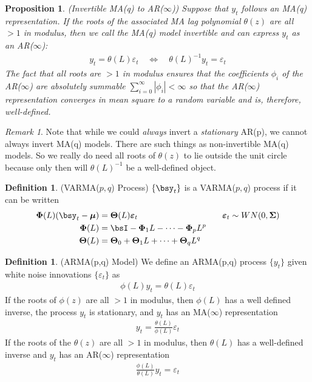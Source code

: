 \documentclass[12pt]{article}
\theoremstyle{plain}
\newtheorem{prop}[thm]{Proposition}
\theoremstyle{definition}
\newtheorem{defn}[thm]{Definition}
\theoremstyle{remark}
\newtheorem*{rmk}{Remark}
\newcommand{\bsTheta}{\boldsymbol{\Theta}}
\newcommand{\bsmu}{\boldsymbol{\mu}}
\newcommand{\bsSigma}{\boldsymbol{\Sigma}}
\newcommand{\bsvarepsilon}{\boldsymbol{\varepsilon}}
\newcommand{\bsPhi}{\boldsymbol{\Phi}}
\begin{document}
\begin{prop}\emph{(Invertible MA(q) to AR($\infty$))}
\label{prop:matoar}
Suppose that $y_t$ follows an MA(q) representation.  If the roots of the
associated MA lag polynomial $\theta(z)$ are all $>1$ in modulus, then
we call the MA(q) model \emph{invertible} and can express $y_t$ as an
AR($\infty$):
\begin{align*}
  y_t = \theta(L)\varepsilon_t
  \quad\iff\quad
  \theta(L)^{-1}y_t = \varepsilon_t
\end{align*}
The fact that all roots are $>1$ in modulus ensures that the
coefficients $\phi_i$ of the AR($\infty$) are absolutely summable
$\sum_{i=0}^\infty |\phi_i|<\infty$ so that the AR($\infty$)
representation converges in mean square to a random variable and is,
therefore, well-defined.
\end{prop}

\begin{rmk}
Note that while we could \emph{always} invert a \emph{stationary} AR(p),
we cannot always invert MA(q) models. There are such things as
non-invertible MA(q) models. So we really do need all roots of
$\theta(z)$ to lie outside the unit circle because only then will
$\theta(L)^{-1}$ be a well-defined object.
\end{rmk}


\begin{defn}(VARMA($p,q$) Process)
$\{\bsy_t\}$ is a VARMA($p,q$) process if it can be written
\begin{align*}
  \bsPhi(L)(\bsy_t-\bsmu) &= \bsTheta(L)\bsvarepsilon_t
  \qquad\qquad\qquad\qquad\qquad \bsvarepsilon_t\sim WN(0,\bsSigma)
  \\
  \bsPhi(L) &= \bsI - \bsPhi_1 L - \cdots - \bsPhi_pL^p
  \\
  \bsTheta(L) &= \bsTheta_0 + \bsTheta_1 L + \cdots + \bsTheta_qL^q
\end{align*}
\end{defn}

\begin{defn}(ARMA(p,q) Model)
We define an ARMA(p,q) process $\{y_t\}$ given white noise innovations
$\{\varepsilon_t\}$ as
\begin{align*}
  \phi(L)y_t = \theta(L)\varepsilon_t
\end{align*}
If the roots of $\phi(z)$ are all $>1$ in modulus, then $\phi(L)$ has a
well defined inverse, the process $y_t$ is stationary, and $y_t$ has an
MA($\infty$) representation
\begin{align*}
  y_t = \frac{\theta(L)}{\phi(L)}\varepsilon_t
\end{align*}
If the roots of the $\theta(z)$ are all $>1$ in modulus, then
$\theta(L)$ has a well-defined inverse and $y_t$ has an AR($\infty$)
representation
\begin{align*}
  \frac{\phi(L)}{\theta(L)}y_t = \varepsilon_t
\end{align*}
\end{defn}
\end{document}
